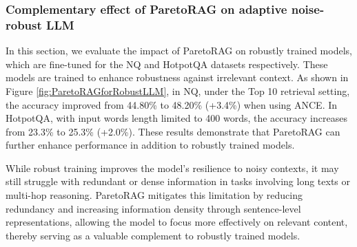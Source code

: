  \subsubsection{Complementary effect of ParetoRAG on adaptive noise-robust LLM}
 \label{sec: detailed-analysis-on-robust-llm}
In this section, we evaluate the impact of ParetoRAG on robustly trained models, which are fine-tuned for the NQ and HotpotQA datasets respectively. These models are trained to enhance robustness against irrelevant context. As shown in Figure \ref{fig:ParetoRAGforRobustLLM}, in NQ, under the Top 10 retrieval setting, the accuracy improved from 44.80\% to 48.20\% (+3.4\%) when using ANCE. In HotpotQA, with input words length limited to 400 words, the accuracy increases from 23.3\% to 25.3\% (+2.0\%). These results demonstrate that ParetoRAG can further enhance performance in addition to robustly trained models.

While robust training improves the model's resilience to noisy contexts, it may still struggle with redundant or dense information in tasks involving long texts or multi-hop reasoning. ParetoRAG mitigates this limitation by reducing redundancy and increasing information density through sentence-level representations, allowing the model to focus more effectively on relevant content, thereby serving as a valuable complement to robustly trained models.

